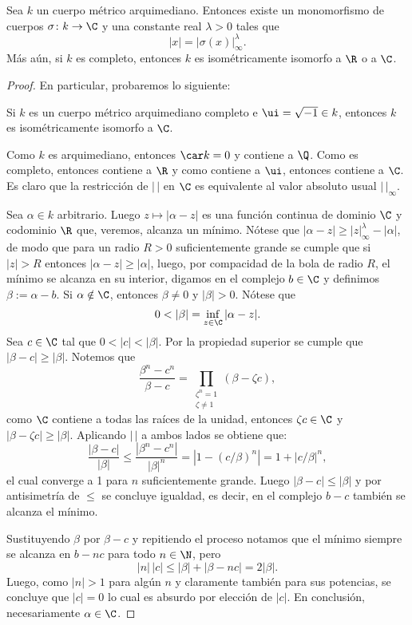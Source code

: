\documentclass[teoria-numeros.tex]{subfiles}
\begin{document}
\begin{thmi}
	Sea $k$ un cuerpo métrico arquimediano.
	Entonces existe un monomorfismo de cuerpos $\sigma\colon k \to \C$ y una constante real $\lambda > 0$ tales que
	$$ |x| = |\sigma(x)|_\infty^\lambda. $$
	Más aún, si $k$ es completo, entonces $k$ es isométricamente isomorfo a $\R$ o a $\C$.
\end{thmi}
\begin{proof}
	En particular, probaremos lo siguiente:
	\begin{displayquote}
		Si $k$ es un cuerpo métrico arquimediano completo e $\ui = \sqrt{-1} \in k$, entonces $k$ es isométricamente isomorfo a $\C$.
	\end{displayquote}
	Como $k$ es arquimediano, entonces $\car k = 0$ y contiene a $\Q$.
	Como es completo, entonces contiene a $\R$ y como contiene a $\ui$, entonces contiene a $\C$.
	Es claro que la restricción de $|\,|$ en $\C$ es equivalente al valor absoluto usual $|\,|_\infty$.

	Sea $\alpha \in k$ arbitrario.
	Luego $z \mapsto |\alpha - z|$ es una función continua de dominio $\C$ y codominio $\R$ que, veremos, alcanza un mínimo.
	Nótese que $|\alpha - z| \ge |z|_\infty^\lambda - |\alpha|$, de modo que para un radio $R > 0$ suficientemente grande
	se cumple que si $|z| > R$ entonces $|\alpha - z| \ge |\alpha|$, luego, por compacidad de la bola de radio $R$, el mínimo se alcanza en su interior,
	digamos en el complejo $b \in \C$ y definimos $\beta := \alpha - b$.
	Si $\alpha \notin \C$, entonces $\beta \ne 0$ y $|\beta| > 0$.
	Nótese que
	$$ 0 < |\beta| = \inf_{z \in \C} |\alpha - z|. $$
	Sea $c \in \C$ tal que $0 < |c| < |\beta|$. Por la propiedad superior se cumple que $|\beta - c| \ge |\beta|$.
	Notemos que
	$$ \frac{\beta^n - c^n}{\beta - c} = \prod_{\substack{\zeta^n = 1 \\ \zeta\ne 1}} (\beta - \zeta c), $$
	como $\C$ contiene a todas las raíces de la unidad, entonces $\zeta c \in \C$ y $|\beta - \zeta c| \ge |\beta|$.
	Aplicando $|\,|$ a ambos lados se obtiene que:
	$$ \frac{|\beta - c|}{|\beta|} \le \frac{|\beta^n - c^n|}{|\beta|^n} = | 1 - (c/\beta)^n | = 1 + |c/\beta|^n, $$
	el cual converge a 1 para $n$ suficientemente grande.
	Luego $|\beta - c| \le |\beta|$ y por antisimetría de $\le$ se concluye igualdad, es decir, en el complejo $b - c$ también se alcanza el mínimo.

	Sustituyendo $\beta$ por $\beta - c$ y repitiendo el proceso notamos que el mínimo siempre se alcanza en $b - nc$ para todo $n \in \N$, pero
	$$ |n| \, |c| \le |\beta| + |\beta - nc| = 2|\beta|. $$
	Luego, como $|n| > 1$ para algún $n$ y claramente también para sus potencias, se concluye que $|c| = 0$ lo cual es absurdo por elección de $|c|$.
	En conclusión, necesariamente $\alpha \in \C$.
\end{proof}
\end{document}
